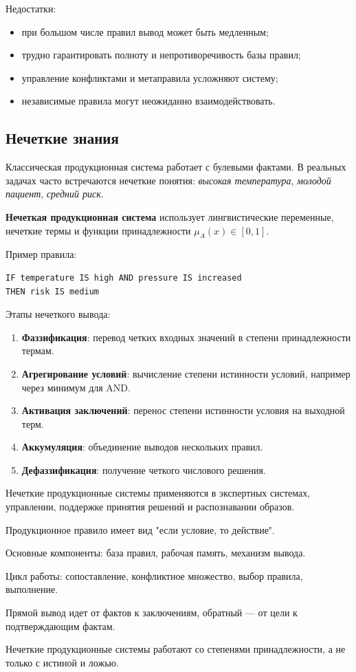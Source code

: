 Недостатки:
\begin{itemize}
    \item при большом числе правил вывод может быть медленным;
    \item трудно гарантировать полноту и непротиворечивость базы правил;
    \item управление конфликтами и метаправила усложняют систему;
    \item независимые правила могут неожиданно взаимодействовать.
\end{itemize}

\subsection*{Нечеткие знания}

Классическая продукционная система работает с булевыми фактами. В реальных задачах часто встречаются нечеткие понятия: \textit{высокая температура}, \textit{молодой пациент}, \textit{средний риск}.

\textbf{Нечеткая продукционная система} использует лингвистические переменные, нечеткие термы и функции принадлежности $\mu_A(x)\in[0,1]$.

Пример правила:
\begin{verbatim}
IF temperature IS high AND pressure IS increased
THEN risk IS medium
\end{verbatim}

Этапы нечеткого вывода:
\begin{enumerate}
    \item \textbf{Фаззификация}: перевод четких входных значений в степени принадлежности термам.
    \item \textbf{Агрегирование условий}: вычисление степени истинности условий, например через минимум для AND.
    \item \textbf{Активация заключений}: перенос степени истинности условия на выходной терм.
    \item \textbf{Аккумуляция}: объединение выводов нескольких правил.
    \item \textbf{Дефаззификация}: получение четкого числового решения.
\end{enumerate}

Нечеткие продукционные системы применяются в экспертных системах, управлении, поддержке принятия решений и распознавании образов.

\begin{important}
    \item Продукционное правило имеет вид "если условие, то действие".
    \item Основные компоненты: база правил, рабочая память, механизм вывода.
    \item Цикл работы: сопоставление, конфликтное множество, выбор правила, выполнение.
    \item Прямой вывод идет от фактов к заключениям, обратный --- от цели к подтверждающим фактам.
    \item Нечеткие продукционные системы работают со степенями принадлежности, а не только с истиной и ложью.
\end{important}
